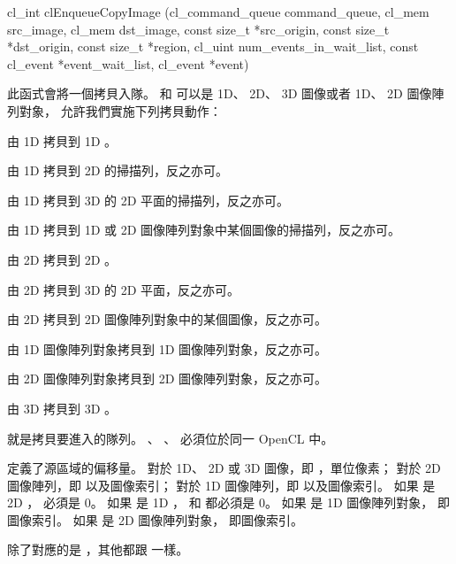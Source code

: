 
\startCLFUNC
cl_int clEnqueueCopyImage (cl_command_queue command_queue,
			cl_mem src_image,
			cl_mem dst_image,
			const size_t *src_origin,
			const size_t *dst_origin,
			const size_t *region,
			cl_uint num_events_in_wait_list,
			const cl_event *event_wait_list,
			cl_event *event)
\stopCLFUNC

此函式會將一個拷貝入隊。
 和  可以是 1D、 2D、 3D 圖像或者 1D、 2D 圖像陣列對象，
允許我們實施下列拷貝動作：
\startigBase
\item 由 1D 拷貝到 1D 。
\item 由 1D 拷貝到 2D  的掃描列，反之亦可。
\item 由 1D 拷貝到 3D  的 2D 平面的掃描列，反之亦可。
\item 由 1D 拷貝到 1D 或 2D 圖像陣列對象中某個圖像的掃描列，反之亦可。
\item 由 2D 拷貝到 2D 。
\item 由 2D 拷貝到 3D  的 2D 平面，反之亦可。
\item 由 2D 拷貝到 2D 圖像陣列對象中的某個圖像，反之亦可。
\item 由 1D 圖像陣列對象拷貝到 1D 圖像陣列對象，反之亦可。
\item 由 2D 圖像陣列對象拷貝到 2D 圖像陣列對象，反之亦可。
\item 由 3D 拷貝到 3D 。
\stopigBase

 就是拷貝要進入的隊列。
、 、 
必須位於同一 OpenCL 中。

 定義了源區域的偏移量。
對於 1D、 2D 或 3D 圖像，即 ，單位像素；
對於 2D 圖像陣列，即  以及圖像索引；
對於 1D 圖像陣列，即  以及圖像索引。
如果  是 2D ，  必須是 0。
如果  是 1D ，
 和  都必須是 0。
如果  是 1D 圖像陣列對象，  即圖像索引。
如果  是 2D 圖像陣列對象，  即圖像索引。

 除了對應的是 ，其他都跟  一樣。

